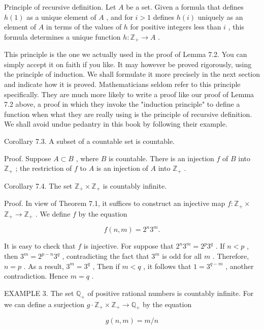 Principle of recursive definition. Let \(A\) be a set. Given a formula that defines \(h\left( 1\right)\) as a unique element of \(A\) , and for \(i > 1\) defines \(h\left( i\right)\) uniquely as an element of \(A\) in terms of the values of \(h\) for positive integers less than \(i\) , this formula determines a unique function \(h : {\mathbb{Z}}_{ + } \rightarrow  A\) .

This principle is the one we actually used in the proof of Lemma 7.2. You can simply accept it on faith if you like. It may however be proved rigorously, using the principle of induction. We shall formulate it more precisely in the next section and indicate how it is proved. Mathematicians seldom refer to this principle specifically. They are much more likely to write a proof like our proof of Lemma 7.2 above, a proof in which they invoke the "induction principle" to define a function when what they are really using is the principle of recursive definition. We shall avoid undue pedantry in this book by following their example.

Corollary 7.3. A subset of a countable set is countable.

Proof. Suppose \(A \subset  B\) , where \(B\) is countable. There is an injection \(f\) of \(B\) into \({\mathbb{Z}}_{ + }\) ; the restriction of \(f\) to \(A\) is an injection of \(A\) into \({\mathbb{Z}}_{ + }\) .

Corollary 7.4. The set \({\mathbb{Z}}_{ + } \times  {\mathbb{Z}}_{ + }\) is countably infinite.

Proof. In view of Theorem 7.1, it suffices to construct an injective map \(f : {\mathbb{Z}}_{ + } \times\)  \({\mathbb{Z}}_{ + } \rightarrow  {\mathbb{Z}}_{ + }\) . We define \(f\) by the equation

\[
f\left( {n,m}\right)  = {2}^{n}{3}^{m}.
\]

It is easy to check that \(f\) is injective. For suppose that \({2}^{n}{3}^{m} = {2}^{p}{3}^{q}\) . If \(n < p\) , then \({3}^{m} = {2}^{p - n}{3}^{q}\) , contradicting the fact that \({3}^{m}\) is odd for all \(m\) . Therefore, \(n = p\) . As a result, \({3}^{m} = {3}^{q}\) , Then if \(m < q\) , it follows that \(1 = {3}^{q - m}\) , another contradiction. Hence \(m = q\) .

EXAMPLE 3. The set \({\mathbb{Q}}_{ + }\) of positive rational numbers is countably infinite. For we can define a surjection \(g \cdot  {\mathbb{Z}}_{ + } \times  {\mathbb{Z}}_{ + } \rightarrow  {\mathbb{Q}}_{ + }\) by the equation

\[
g\left( {n,m}\right)  = m/n
\]

